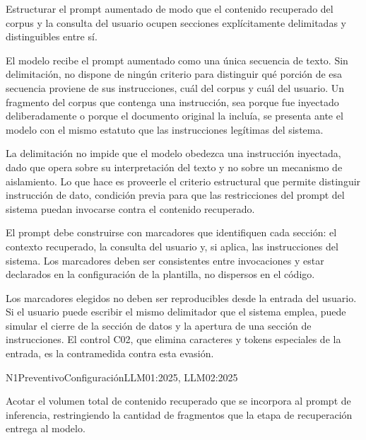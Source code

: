 Estructurar el prompt aumentado de modo que el contenido recuperado del corpus y la consulta del usuario ocupen secciones explícitamente delimitadas y distinguibles entre sí.

El modelo recibe el prompt aumentado como una única secuencia de texto. Sin delimitación, no dispone de ningún criterio para distinguir qué porción de esa secuencia proviene de sus instrucciones, cuál del corpus y cuál del usuario. Un fragmento del corpus que contenga una instrucción, sea porque fue inyectado deliberadamente o porque el documento original la incluía, se presenta ante el modelo con el mismo estatuto que las instrucciones legítimas del sistema.

La delimitación no impide que el modelo obedezca una instrucción inyectada, dado que opera sobre su interpretación del texto y no sobre un mecanismo de aislamiento. Lo que hace es proveerle el criterio estructural que permite distinguir instrucción de dato, condición previa para que las restricciones del prompt del sistema puedan invocarse contra el contenido recuperado.

El prompt debe construirse con marcadores que identifiquen cada sección: el contexto recuperado, la consulta del usuario y, si aplica, las instrucciones del sistema. Los marcadores deben ser consistentes entre invocaciones y estar declarados en la configuración de la plantilla, no dispersos en el código.

Los marcadores elegidos no deben ser reproducibles desde la entrada del usuario. Si el usuario puede escribir el mismo delimitador que el sistema emplea, puede simular el cierre de la sección de datos y la apertura de una sección de instrucciones. El control C02, que elimina caracteres y tokens especiales de la entrada, es la contramedida contra esta evasión.


  {N1}{Preventivo}{Configuración}{LLM01:2025, LLM02:2025}

Acotar el volumen total de contenido recuperado que se incorpora al prompt de inferencia, restringiendo la cantidad de fragmentos que la etapa de recuperación entrega al modelo.

